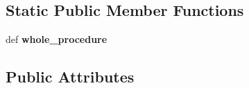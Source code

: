 \subsection*{Static Public Member Functions}
\begin{DoxyCompactItemize}
\item 
\hypertarget{classsrc_1_1core_1_1execution_1_1DisorderAnalysis_1_1DisorderAnalysis_a9f64ed2569e811d4c8db1549d8f0be9c}{def {\bfseries whole\-\_\-procedure}}\label{classsrc_1_1core_1_1execution_1_1DisorderAnalysis_1_1DisorderAnalysis_a9f64ed2569e811d4c8db1549d8f0be9c}

\end{DoxyCompactItemize}
\subsection*{Public Attributes}
